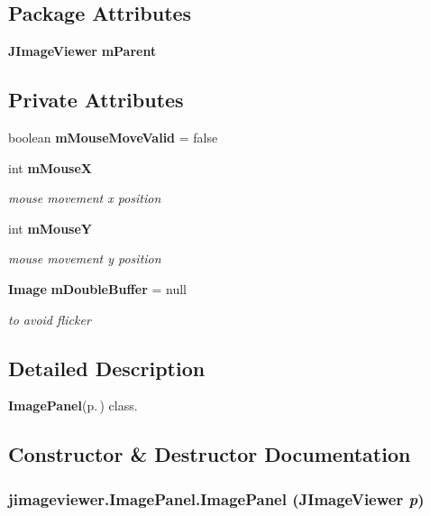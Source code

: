\subsection*{Package Attributes}
\begin{CompactItemize}
\item 
{\bf JImage\-Viewer} {\bf m\-Parent}
\end{CompactItemize}
\subsection*{Private Attributes}
\begin{CompactItemize}
\item 
boolean {\bf m\-Mouse\-Move\-Valid} = false
\item 
int {\bf m\-Mouse\-X}
\begin{CompactList}\small\item\em mouse movement x position \item\end{CompactList}\item 
int {\bf m\-Mouse\-Y}
\begin{CompactList}\small\item\em mouse movement y position \item\end{CompactList}\item 
{\bf Image} {\bf m\-Double\-Buffer} = null
\begin{CompactList}\small\item\em to avoid flicker \item\end{CompactList}\end{CompactItemize}


\subsection{Detailed Description}
{\bf Image\-Panel}{\rm (p.\,\pageref{classjimageviewer_1_1_image_panel})} class. 



\subsection{Constructor \& Destructor Documentation}
\subsubsection{\setlength{\rightskip}{0pt plus 5cm}jimageviewer.Image\-Panel.Image\-Panel ({\bf JImage\-Viewer} {\em p})\hspace{0.3cm}{\tt  [package]}}\label{classjimageviewer_1_1_image_panel_b6b5526c0fd2e18237eaa5101eead662}


